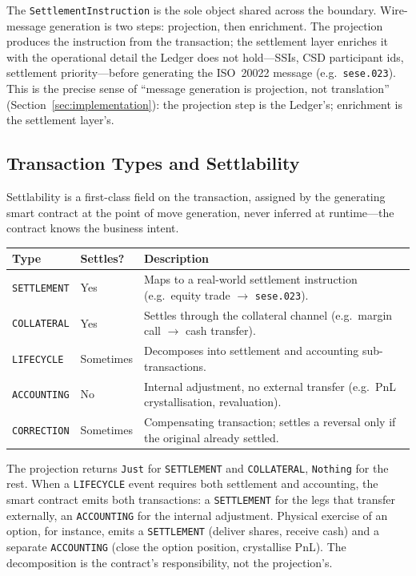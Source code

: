 \documentclass[11pt,a4paper]{article}
\begin{document}
The \texttt{SettlementInstruction} is the sole object shared across the boundary. Wire-message generation is two steps: projection, then enrichment. The projection produces the instruction from the transaction; the settlement layer enriches it with the operational detail the Ledger does not hold---SSIs, CSD participant ids, settlement priority---before generating the ISO~20022 message (e.g.\ \texttt{sese.023}). This is the precise sense of ``message generation is projection, not translation'' (Section~\ref{sec:implementation}): the projection step is the Ledger's; enrichment is the settlement layer's.

\subsection{Transaction Types and Settlability}
\label{sec:settlement-types}

Settlability is a first-class field on the transaction, assigned by the generating smart contract at the point of move generation, never inferred at runtime---the contract knows the business intent.

\begin{center}
\begin{tabular}{l l p{7.5cm}}
\toprule
\textbf{Type} & \textbf{Settles?} & \textbf{Description} \\
\midrule
\texttt{SETTLEMENT} & Yes & Maps to a real-world settlement instruction (e.g.\ equity trade $\to$ \texttt{sese.023}). \\
\texttt{COLLATERAL} & Yes & Settles through the collateral channel (e.g.\ margin call $\to$ cash transfer). \\
\texttt{LIFECYCLE} & Sometimes & Decomposes into settlement and accounting sub-transactions. \\
\texttt{ACCOUNTING} & No & Internal adjustment, no external transfer (e.g.\ PnL crystallisation, revaluation). \\
\texttt{CORRECTION} & Sometimes & Compensating transaction; settles a reversal only if the original already settled. \\
\bottomrule
\end{tabular}
\end{center}

The projection returns \texttt{Just} for \texttt{SETTLEMENT} and \texttt{COLLATERAL}, \texttt{Nothing} for the rest. When a \texttt{LIFECYCLE} event requires both settlement and accounting, the smart contract emits both transactions: a \texttt{SETTLEMENT} for the legs that transfer externally, an \texttt{ACCOUNTING} for the internal adjustment. Physical exercise of an option, for instance, emits a \texttt{SETTLEMENT} (deliver shares, receive cash) and a separate \texttt{ACCOUNTING} (close the option position, crystallise PnL). The decomposition is the contract's responsibility, not the projection's.
\end{document}
